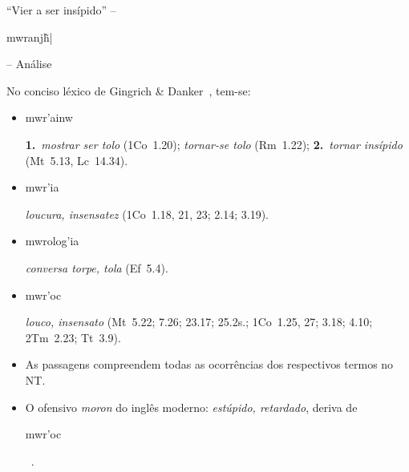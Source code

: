\documentclass[12pt,aspectratio=169]{beamer}
\newcommand{\YEL}[1]{{\textcolor{TXyel}{#1}}}
\newcommand{\CYA}[1]{{\textcolor{TXcya}{#1}}}
\newcommand{\BRI}[1]{{\textcolor{BSpbg}{#1}}}   %
\newcommand{\GRtxt}[1]{\begin{otherlanguage}{greek}{{#1}}\end{otherlanguage}}
\begin{document}
    \begin{frame}{\BRI{``Vier a ser insípido''} -- \BRI{\GRtxt{mwranj\~h|}} -- \BRI{Análise}}
        No conciso léxico de \BRI{Gingrich \& Danker}~\cite{2007-GingrichFW-VidaNova}, tem-se:
        \\[\medskipamount]
        \begin{itemize}
            \item<1-> \YEL{\GRtxt{mwr'ainw}} \BRI{\bf 1.}~\CYA{\textit{mostrar ser tolo}} (1Co~1.20);
                \CYA{\textit{tornar-se tolo}} (Rm~1.22); \BRI{\bf 2.}~\CYA{\textit{tornar
                insípido}} (Mt~5.13, Lc~14.34).
                \\[\medskipamount]
            \item<2-> \YEL{\GRtxt{mwr'ia}} \CYA{\textit{loucura, insensatez}} (1Co~1.18, 21, 23;
                2.14; 3.19).
                \\[\medskipamount]
            \item<3-> \YEL{\GRtxt{mwrolog'ia}} \CYA{\textit{conversa torpe, tola}} (Ef~5.4).
                \\[\medskipamount]
            \item<4-> \YEL{\GRtxt{mwr'oc}} \CYA{\textit{louco, insensato}} (Mt~5.22; 7.26;
                23.17; 25.2s.; 1Co~1.25, 27; 3.18; 4.10; 2Tm~2.23; Tt~3.9).
                \\[\medskipamount]
            \item<5-> As passagens compreendem \BRI{todas} as ocorrências dos respectivos termos
                no NT.
                \\[\medskipamount]
            \item<6-> O ofensivo \CYA{\textit{moron}} do inglês moderno: \CYA{\textit{estúpido,
                retardado}}, deriva de
                \YEL{\GRtxt{mwr'oc}}~\cite{1993-ZodhiatesS+HadjiantoniouG-AMG}.
        \end{itemize}
    \end{frame}
\end{document}
